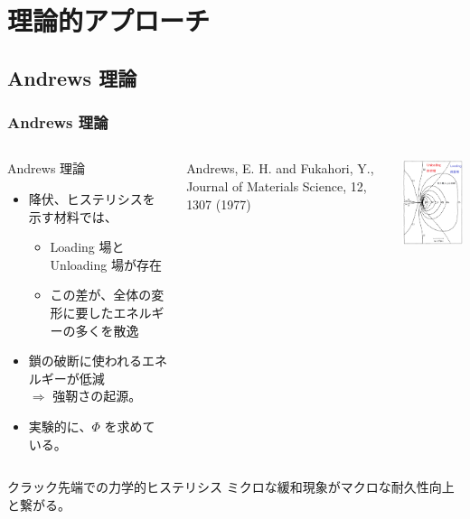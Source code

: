 \documentclass[11pt, dvipdfmx]{beamer}
\begin{document}
\section{理論的アプローチ}



\subsection{Andrews 理論}
%
\begin{frame}
\frametitle{Andrews 理論}

\small

\begin{columns}[totalwidth=1\textwidth]
\begin{exampleblock}{\Large Andrews 理論}
	\begin{itemize}
	\item
	降伏、ヒステリシスを示す材料では、
		\begin{itemize}
		\item
		Loading 場とUnloading 場が存在
		\item
		この差が、全体の変形に要したエネルギーの多くを散逸
		\end{itemize}	
	\item
	\alert{鎖の破断に使われるエネルギーが低減} \\$\Rightarrow$ 強靭さの起源。
	\item
	実験的に、$\Phi$ を求めている。
	\end{itemize}
\end{exampleblock}

{Andrews, E. H. and Fukahori, Y., Journal of Materials Science, 12, 1307 (1977)}

\centering
\includegraphics[width=40mm]{fig/crack.png}
\end{columns}

\begin{alertblock}{クラック先端での力学的ヒステリシス}
ミクロな緩和現象がマクロな耐久性向上と繋がる。
\end{alertblock}

\end{frame}
\end{document}
